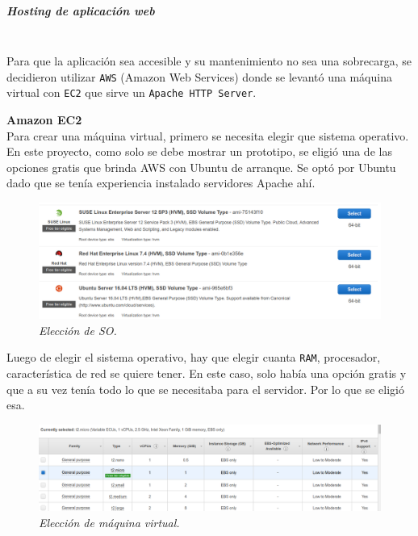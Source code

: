 \subparagraph{Hosting de aplicación web}\mbox{}\mbox{}\\
Para que la aplicación sea accesible y su mantenimiento no sea una sobrecarga, se decidieron utilizar \lstinline[columns=fixed]{AWS} (Amazon Web Services) donde se levantó una máquina virtual con \lstinline[columns=fixed]{EC2} que sirve un \lstinline[columns=fixed]{Apache HTTP Server}.

\textbf{Amazon EC2}\\
Para crear una máquina virtual, primero se necesita elegir que sistema operativo. En este proyecto, como solo se debe mostrar un prototipo, se eligió una de las opciones gratis que brinda AWS con Ubuntu de arranque. Se optó por Ubuntu dado que se tenía experiencia instalado servidores Apache ahí. 

\begin{figure}[H]
  \centering
  \includegraphics[width=\textwidth, keepaspectratio]{images/AWS1}
  \caption{\textit{Elección de SO.}}
  \label{fig:AWS1}
\end{figure}

Luego de elegir el sistema operativo, hay que elegir cuanta \lstinline[columns=fixed]{RAM}, procesador, característica de red se quiere tener. En este caso, solo había una opción gratis  y que a su vez tenía todo lo que se necesitaba para el servidor. Por lo que se eligió esa. 

\begin{figure}[H]
  \centering
  \includegraphics[width=\textwidth, keepaspectratio]{images/AWS2}
  \caption{\textit{Elección de máquina virtual.}}
  \label{fig:AWS2}
\end{figure}

